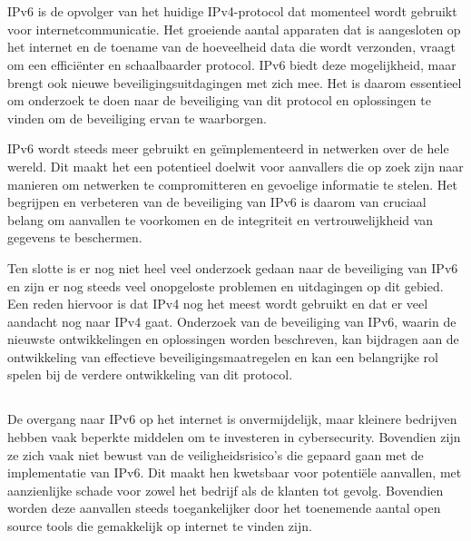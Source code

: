 
\chapter{}%
\label{ch:inleiding}


IPv6 is de opvolger van het huidige IPv4-protocol dat momenteel wordt gebruikt voor internetcommunicatie. Het groeiende aantal apparaten dat is aangesloten op het internet en de toename van de hoeveelheid data die wordt verzonden, vraagt om een efficiënter en schaalbaarder protocol. IPv6 biedt deze mogelijkheid, maar brengt ook nieuwe beveiligingsuitdagingen met zich mee. Het is daarom essentieel om onderzoek te doen naar de beveiliging van dit protocol en oplossingen te vinden om de beveiliging ervan te waarborgen.
\newline

IPv6 wordt steeds meer gebruikt en geïmplementeerd in netwerken over de hele wereld. Dit maakt het een potentieel doelwit voor aanvallers die op zoek zijn naar manieren om netwerken te compromitteren en gevoelige informatie te stelen. Het begrijpen en verbeteren van de beveiliging van IPv6 is daarom van cruciaal belang om aanvallen te voorkomen en de integriteit en vertrouwelijkheid van gegevens te beschermen.
\newline

Ten slotte is er nog niet heel veel onderzoek gedaan naar de beveiliging van IPv6 en zijn er nog steeds veel onopgeloste problemen en uitdagingen op dit gebied. Een reden hiervoor is dat IPv4 nog het meest wordt gebruikt en dat er veel aandacht nog naar IPv4 gaat. Onderzoek van de beveiliging van IPv6, waarin de nieuwste ontwikkelingen en oplossingen worden beschreven, kan bijdragen aan de ontwikkeling van effectieve beveiligingsmaatregelen en kan een belangrijke rol spelen bij de verdere ontwikkeling van dit protocol.
\clearpage


\section{}%
\label{sec:probleemstelling}

De overgang naar IPv6 op het internet is onvermijdelijk, maar kleinere bedrijven hebben vaak beperkte middelen om te investeren in cybersecurity. Bovendien zijn ze zich vaak niet bewust van de veiligheidsrisico's die gepaard gaan met de implementatie van IPv6. Dit maakt hen kwetsbaar voor potentiële aanvallen, met aanzienlijke schade voor zowel het bedrijf als de klanten tot gevolg. Bovendien worden deze aanvallen steeds toegankelijker door het toenemende aantal open source tools die gemakkelijk op internet te vinden zijn.

